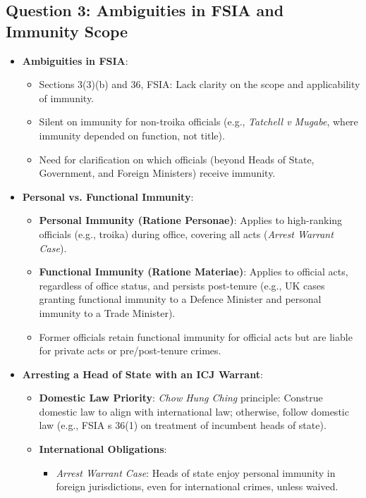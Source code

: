 \subsection{Question 3: Ambiguities in FSIA and Immunity Scope}
\begin{itemize}
    \item \textbf{Ambiguities in FSIA}:
    \begin{itemize}
        \item Sections 3(3)(b) and 36, FSIA: Lack clarity on the scope and applicability of immunity.
        \item Silent on immunity for non-troika officials (e.g., \textit{Tatchell v Mugabe}, where immunity depended on function, not title).
        \item Need for clarification on which officials (beyond Heads of State, Government, and Foreign Ministers) receive immunity.
    \end{itemize}
    \item \textbf{Personal vs. Functional Immunity}:
    \begin{itemize}
        \item \textbf{Personal Immunity (Ratione Personae)}: Applies to high-ranking officials (e.g., troika) during office, covering all acts (\textit{Arrest Warrant Case}).
        \item \textbf{Functional Immunity (Ratione Materiae)}: Applies to official acts, regardless of office status, and persists post-tenure (e.g., UK cases granting functional immunity to a Defence Minister and personal immunity to a Trade Minister).
        \item Former officials retain functional immunity for official acts but are liable for private acts or pre/post-tenure crimes.
    \end{itemize}
    \item \textbf{Arresting a Head of State with an ICJ Warrant}:
    \begin{itemize}
        \item \textbf{Domestic Law Priority}: \textit{Chow Hung Ching} principle: Construe domestic law to align with international law; otherwise, follow domestic law (e.g., FSIA s 36(1) on treatment of incumbent heads of state).
        \item \textbf{International Obligations}:
        \begin{itemize}
            \item \textit{Arrest Warrant Case}: Heads of state enjoy personal immunity in foreign jurisdictions, even for international crimes, unless waived.

\end{itemize}
\end{itemize}
\end{itemize}
